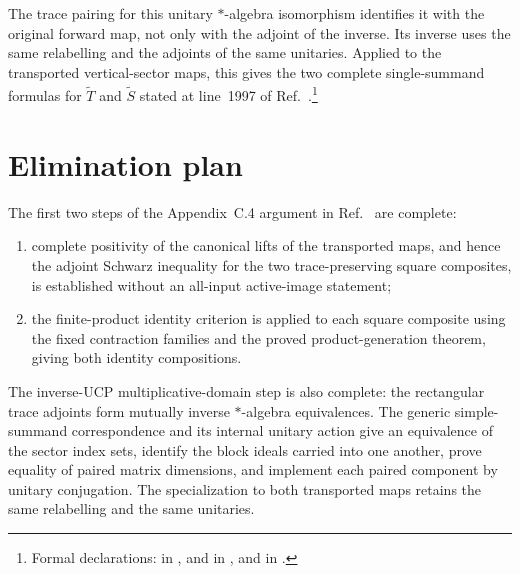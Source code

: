\documentclass{article}
\begin{document}
The trace pairing for this unitary $*$-algebra isomorphism identifies it with
the original forward map, not only with the adjoint of the inverse. Its inverse
uses the same relabelling and the adjoints of the same unitaries. Applied to
the transported vertical-sector maps, this gives the two complete
single-summand formulas for $\widetilde T$ and $\widetilde S$ stated at
line~1997 of Ref.~\cite{Cirac2016MPDO_arXiv}.\footnote{Formal declarations:
in , and
 in
, and
 in
.}

\section{Elimination plan}

The first two steps of the Appendix~C.4 argument in
Ref.~\cite{Cirac2016MPDO_arXiv} are complete:
\begin{enumerate}
    \item complete positivity of the canonical lifts of the transported maps,
          and hence the adjoint Schwarz inequality for the two
          trace-preserving square composites, is established without an
          all-input active-image statement;
    \item the finite-product identity criterion is applied to each square
          composite using the fixed contraction families and the proved
          product-generation theorem, giving both identity compositions.
\end{enumerate}
The inverse-UCP multiplicative-domain step is also complete: the rectangular
trace adjoints form mutually inverse $*$-algebra equivalences. The generic
simple-summand correspondence and its internal unitary action give an
equivalence of the sector index sets, identify the block ideals carried into
one another, prove equality of paired matrix dimensions, and implement each
paired component by unitary conjugation. The specialization to both
transported maps retains the same relabelling and the same unitaries.
\end{document}
